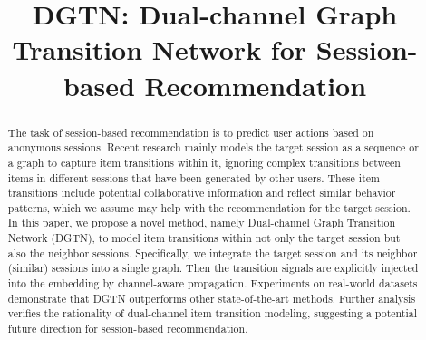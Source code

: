 \documentclass[conference]{IEEEtran}
\begin{document}
\title{DGTN: Dual-channel Graph Transition Network for Session-based Recommendation}








\author{

}


\maketitle

\begin{abstract}
The task of session-based recommendation is to predict user actions based on anonymous sessions. Recent research mainly models the target session as a sequence or a graph to capture item transitions within it, ignoring complex transitions between items in different sessions that have been generated by other users. These item transitions include potential collaborative information and reflect similar behavior patterns, which we assume may help with the recommendation for the target session. In this paper, we propose a novel method, namely Dual-channel Graph Transition Network (DGTN), to model item transitions within not only the target session but also the neighbor sessions. Specifically, we integrate the target session and its neighbor (similar) sessions into a single graph. Then the transition signals are explicitly injected into the embedding by channel-aware propagation. Experiments on real-world datasets demonstrate that DGTN outperforms other state-of-the-art methods. Further analysis verifies the rationality of dual-channel item transition modeling, suggesting a potential future direction for session-based recommendation.
\end{abstract}
\end{document}
